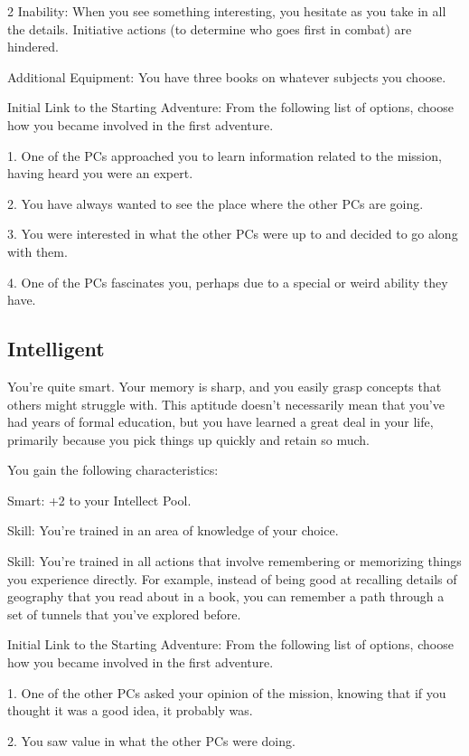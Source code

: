 \begin{multicols}{2}
Inability: When you see something interesting, you hesitate as you take in all the details. Initiative actions (to determine who goes first in combat) are hindered.

Additional Equipment: You have three books on whatever subjects you choose.

Initial Link to the Starting Adventure: From the following list of options, choose how you became involved in the first adventure.

1. One of the PCs approached you to learn information related to the mission, having heard you were an expert.

2. You have always wanted to see the place where the other PCs are going.

3. You were interested in what the other PCs were up to and decided to go along with them.

4. One of the PCs fascinates you, perhaps due to a special or weird ability they have.

\subsection{Intelligent}

You’re quite smart. Your memory is sharp, and you easily grasp concepts that others might struggle with. This aptitude doesn’t necessarily mean that you’ve had years of formal education, but you have learned a great deal in your life, primarily because you pick things up quickly and retain so much.

You gain the following characteristics:

Smart: +2 to your Intellect Pool.

Skill: You’re trained in an area of knowledge of your choice.

Skill: You’re trained in all actions that involve remembering or memorizing things you experience directly. For example, instead of being good at recalling details of geography that you read about in a book, you can remember a path through a set of tunnels that you’ve explored before.

Initial Link to the Starting Adventure: From the following list of options, choose how you became involved in the first adventure.

1. One of the other PCs asked your opinion of the mission, knowing that if you thought it was a good idea, it probably was.

2. You saw value in what the other PCs were doing.


\end{multicols}
